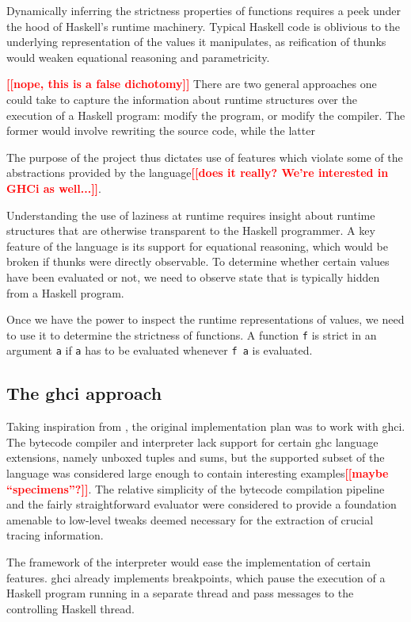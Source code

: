 \documentclass[thesis=B,english]{FITthesis}[2019/12/23]
\newcommand{\todo}[1]{\textcolor{red}{\textbf{[[#1]]}}}
\newcommand{\hsCode}[1]{\texttt{#1}}
\begin{document}
Dynamically inferring the strictness properties of functions requires a peek
under the hood of Haskell's runtime machinery. Typical Haskell code is
oblivious to the underlying representation of the values it manipulates, as
reification of thunks would weaken equational reasoning and parametricity.

\todo{nope, this is a false dichotomy}
There are two general approaches one could take to capture the information
about runtime structures over the execution of a Haskell program: modify the
program, or modify the compiler. The former would involve rewriting the source
code, while the latter

The purpose of the
project thus dictates use of features which violate some of the abstractions
provided by the language\todo{does it really? We're interested in GHCi as
well...}.

Understanding the use of laziness at runtime requires insight about runtime
structures that are otherwise transparent to the Haskell programmer. A key
feature of the language is its support for equational reasoning, which would be
broken if thunks were directly observable. To determine whether certain values
have been evaluated or not, we need to observe state that is typically hidden
from a Haskell program.

Once we have the power to inspect the runtime representations of values, we
need to use it to determine the strictness of functions. A function \hsCode{f}
is strict in an argument \hsCode{a} if \hsCode{a} has to be evaluated whenever
\hsCode{f a} is evaluated.

\subsection{The \acrshort{ghci} approach} \label{sec:ghci-approach}
Taking inspiration from \cite{emp-study-laziness-r}, the original
implementation plan was to work with \acrfull{ghci}. The bytecode compiler and
interpreter lack support for certain \acrshort{ghc} language extensions, namely
un\-box\-ed tuples and sums, but the supported subset of the language was
considered large enough to contain interesting examples\todo{maybe
``specimens''?}. The relative simplicity of the bytecode compilation pipeline
and the fairly straightforward evaluator were considered to provide a
foundation amenable to low-level tweaks deemed necessary for the extraction of
crucial tracing information.

The framework of the interpreter would ease the implementation of certain
features. \acrshort{ghci} already implements breakpoints, which pause the
execution of a Haskell program running in a separate thread and pass messages
to the controlling Haskell thread.
\end{document}
